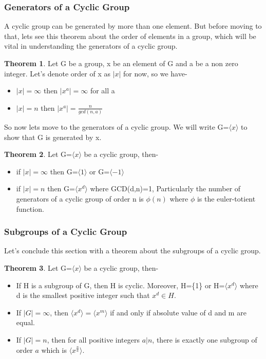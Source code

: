 \documentclass[12pt,a4paper,oneside]{report}
\theoremstyle{definition}
\newtheorem{theorem}{Theorem}
\begin{document}
\subsubsection{Generators of a Cyclic Group}
A cyclic group can be generated by more than one element. But before moving to that, lets see this theorem about the order of elements in a group, which will be vital in understanding the generators of a cyclic group.
\begin{theorem}
  Let G be a group, x be an element of G and a be a non zero integer. Let's denote order of x as $|x|$ for now, so we have-
  \begin{itemize}
    \item $|x|=\infty$ then $|x^a|=\infty$ for all a
    \item $|x|=n$ then $|x^a|=\frac{n}{gcd(n,a)}$
  \end{itemize}
\end{theorem}
So now lets move to the generators of a cyclic group. We will write G=$\langle x \rangle$ to show that G is generated by x.
\begin{theorem}
  Let G=$\langle x \rangle$ be a cyclic group, then-
  \begin{itemize}
    \item if $|x|=\infty$ then G=$\langle 1 \rangle$ or G=$\langle -1 \rangle$
    \item if $|x|=n$ then G=$\langle x^d \rangle$ where GCD(d,n)=1, Particularly the number of generators of a cyclic group of order n is $\phi(n)$ where $\phi$ is the euler-totient function.
  \end{itemize}
\end{theorem}
\subsubsection{Subgroups of a Cyclic Group}
Let's conclude this section with a theorem about the subgroups of a cyclic group.
\begin{theorem}
  Let G=$\langle x \rangle$ be a cyclic group, then-
  \begin{itemize}
    \item If H is a subgroup of G, then H is cyclic. Moreover, H=\{1\} or H=$\langle x^d \rangle$ where d is the smallest positive integer such that $x^d \in H$.
    \item If $|G|=\infty$, then $\langle x^d \rangle=\langle x^m \rangle$ if and only if absolute value of d and m are equal.
    \item If $|G|=n$, then for all positive integers $a|n$, there is exactly one subgroup of order $a$ which is $\langle x^{\frac{n}{a}} \rangle$.
  \end{itemize}
\end{theorem}
\end{document}
